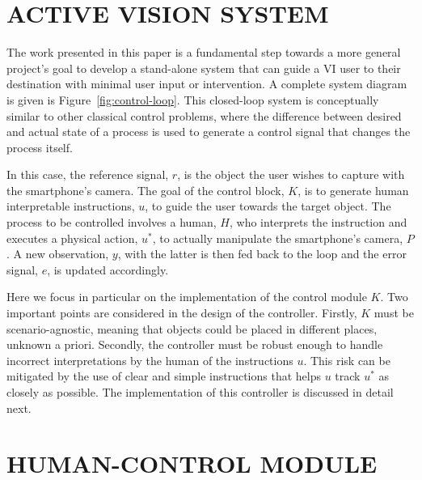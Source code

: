 \documentclass[a4paper, twoside]{article}
\begin{document}
\section{\uppercase{Active Vision System}}\label{sec:system-design}

\noindent The work presented in this paper is a fundamental step towards a more general project's goal to develop a stand-alone system that can guide a VI user to their destination with minimal user input or intervention. A complete system diagram is given is Figure~\ref{fig:control-loop}. This closed-loop system is conceptually similar to other classical control problems, where the difference between desired and actual state of a process is used to generate a control signal that changes the process itself.

In this case, the reference signal, $r$, is the object the user wishes to capture with the smartphone's camera. The goal of the control block, $K$, is to generate human interpretable instructions, $u$, to guide the user towards the target object. The process to be controlled involves a human, $H$, who interprets the instruction and executes a physical action, $u^*$, to actually manipulate the smartphone's camera, $P$. A new observation, $y$, with the latter is then fed back to the loop and the error signal, $e$, is updated accordingly.  

Here we focus in particular on the implementation of the control module $K$. Two important points are considered in the design of the controller. Firstly, $K$ must be scenario-agnostic, meaning that objects could be placed in different places, unknown a priori. Secondly, the controller must be robust enough to handle incorrect interpretations by the human of the instructions $u$. This risk can be mitigated by the use of clear and simple instructions that helps $u$ track $u^*$ as closely as possible. The implementation of this controller is discussed in detail next. 

\section{\uppercase{Human-control Module}}\label{sec:controller-design}
\end{document}
